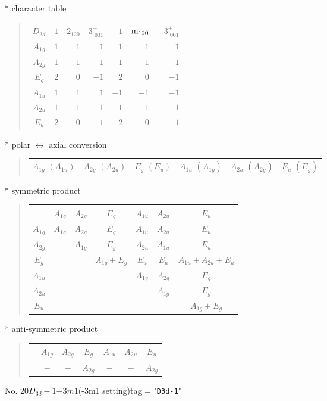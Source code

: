 \documentclass[fleqn,10pt,landscape]{jsarticle}
\begin{document}
* character table
\begin{quote}
\begin{tabular}{crrrrrr} \hline \hline
$ D_{3d} $ & $ 1 $ & $ 2{}_{120} $ & $ 3^{+}_{\,\,001} $ & $ -1 $ & $ {\rm m}_{120} $ & $ -3^{+}_{\,\,001} $ \\ \hline
$ A_{1g} $ & $ 1 $ & $ 1 $ & $ 1 $ & $ 1 $ & $ 1 $ & $ 1 $ \\
$ A_{2g} $ & $ 1 $ & $ -1 $ & $ 1 $ & $ 1 $ & $ -1 $ & $ 1 $ \\
$ E_{g} $ & $ 2 $ & $ 0 $ & $ -1 $ & $ 2 $ & $ 0 $ & $ -1 $ \\
$ A_{1u} $ & $ 1 $ & $ 1 $ & $ 1 $ & $ -1 $ & $ -1 $ & $ -1 $ \\
$ A_{2u} $ & $ 1 $ & $ -1 $ & $ 1 $ & $ -1 $ & $ 1 $ & $ -1 $ \\
$ E_{u} $ & $ 2 $ & $ 0 $ & $ -1 $ & $ -2 $ & $ 0 $ & $ 1 $ \\
 \hline \hline
\end{tabular}
\end{quote}
* polar $\leftrightarrow$ axial conversion
\begin{quote}
\begin{tabular}{cccccc}
$ A_{1g}\,\,(A_{1u}) $ & $ A_{2g}\,\,(A_{2u}) $ & $ E_{g}\,\,(E_{u}) $ & $ A_{1u}\,\,(A_{1g}) $ & $ A_{2u}\,\,(A_{2g}) $ & $ E_{u}\,\,(E_{g}) $
\end{tabular}
\end{quote}
* symmetric product
\begin{quote}
\begin{tabular}{c|cccccc} \hline \hline
 & $ A_{1g} $ & $ A_{2g} $ & $ E_{g} $ & $ A_{1u} $ & $ A_{2u} $ & $ E_{u} $ \\ \hline
$ A_{1g} $ & $ A_{1g} $ & $ A_{2g} $ & $ E_{g} $ & $ A_{1u} $ & $ A_{2u} $ & $ E_{u} $ \\
$ A_{2g} $ & $  $ & $ A_{1g} $ & $ E_{g} $ & $ A_{2u} $ & $ A_{1u} $ & $ E_{u} $ \\
$ E_{g} $ & $  $ & $  $ & $ A_{1g} + E_{g} $ & $ E_{u} $ & $ E_{u} $ & $ A_{1u} + A_{2u} + E_{u} $ \\
$ A_{1u} $ & $  $ & $  $ & $  $ & $ A_{1g} $ & $ A_{2g} $ & $ E_{g} $ \\
$ A_{2u} $ & $  $ & $  $ & $  $ & $  $ & $ A_{1g} $ & $ E_{g} $ \\
$ E_{u} $ & $  $ & $  $ & $  $ & $  $ & $  $ & $ A_{1g} + E_{g} $ \\
 \hline \hline
\end{tabular}
\end{quote}
* anti-symmetric product
\begin{quote}
\begin{tabular}{ccccccc} \hline \hline
 & $ A_{1g} $ & $ A_{2g} $ & $ E_{g} $ & $ A_{1u} $ & $ A_{2u} $ & $ E_{u} $ \\ \hline
$  $ & $ - $ & $ - $ & $ A_{2g} $ & $ - $ & $ - $ & $ A_{2g} $ \\
 \hline \hline
\end{tabular}
\end{quote}
\newpage
No. 20\quad$D_{3d}-1$\quad$-3m1$\quad(-3m1 setting)\quad[ trigonal ]
tag = "{\tt D3d-1}"
\end{document}
